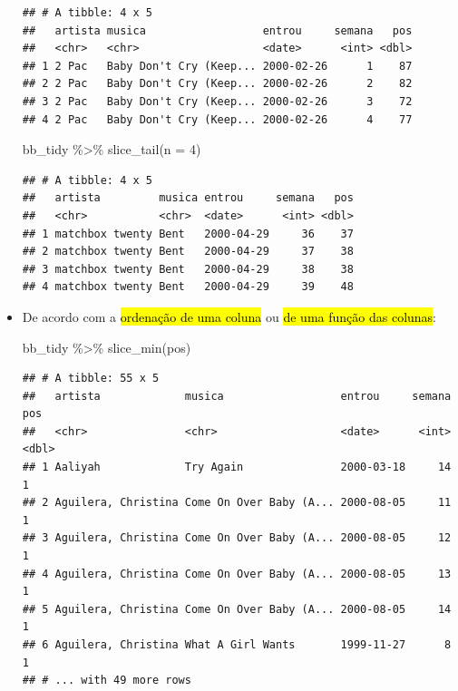 \documentclass[
  11pt]{report}
\newenvironment{Shaded}{\begin{snugshade}}{\end{snugshade}}
\newcommand{\AttributeTok}[1]{\textcolor[rgb]{0.77,0.63,0.00}{#1}}
\newcommand{\DecValTok}[1]{\textcolor[rgb]{0.00,0.00,0.81}{#1}}
\newcommand{\FunctionTok}[1]{\textcolor[rgb]{0.00,0.00,0.00}{#1}}
\newcommand{\NormalTok}[1]{#1}
\newcommand{\SpecialCharTok}[1]{\textcolor[rgb]{0.00,0.00,0.00}{#1}}
\renewenvironment{Shaded}{
    \begin{mdframed}[%
      roundcorner=2pt,%
      innerleftmargin=5pt,%
      innerrightmargin=5pt,%
      topline=true,%
      leftline=true,%
      rightline=true,%
      bottomline=true,%
      linewidth=0.5pt,%
      linecolor=black!20,%
      backgroundcolor=black!2,%
      skipabove=2ex,%
      skipbelow=2.5ex%
    ]%
  }
  {
    \end{mdframed}
  }
\begin{document}
\begin{itemize}
\begin{verbatim}
## # A tibble: 4 x 5
##   artista musica                  entrou     semana   pos
##   <chr>   <chr>                   <date>      <int> <dbl>
## 1 2 Pac   Baby Don't Cry (Keep... 2000-02-26      1    87
## 2 2 Pac   Baby Don't Cry (Keep... 2000-02-26      2    82
## 3 2 Pac   Baby Don't Cry (Keep... 2000-02-26      3    72
## 4 2 Pac   Baby Don't Cry (Keep... 2000-02-26      4    77
\end{verbatim}

\begin{Shaded}
\begin{Highlighting}[]
\NormalTok{bb\_tidy }\SpecialCharTok{\%\textgreater{}\%} 
  \FunctionTok{slice\_tail}\NormalTok{(}\AttributeTok{n =} \DecValTok{4}\NormalTok{)}
\end{Highlighting}
\end{Shaded}

\begin{verbatim}
## # A tibble: 4 x 5
##   artista         musica entrou     semana   pos
##   <chr>           <chr>  <date>      <int> <dbl>
## 1 matchbox twenty Bent   2000-04-29     36    37
## 2 matchbox twenty Bent   2000-04-29     37    38
## 3 matchbox twenty Bent   2000-04-29     38    38
## 4 matchbox twenty Bent   2000-04-29     39    48
\end{verbatim}
\item
  De acordo com a {\hl{ordenação de uma coluna}} ou {\hl{de uma função das colunas}}:

\begin{Shaded}
\begin{Highlighting}[]
\NormalTok{bb\_tidy }\SpecialCharTok{\%\textgreater{}\%} 
  \FunctionTok{slice\_min}\NormalTok{(pos)}
\end{Highlighting}
\end{Shaded}

\begin{verbatim}
## # A tibble: 55 x 5
##   artista             musica                  entrou     semana   pos
##   <chr>               <chr>                   <date>      <int> <dbl>
## 1 Aaliyah             Try Again               2000-03-18     14     1
## 2 Aguilera, Christina Come On Over Baby (A... 2000-08-05     11     1
## 3 Aguilera, Christina Come On Over Baby (A... 2000-08-05     12     1
## 4 Aguilera, Christina Come On Over Baby (A... 2000-08-05     13     1
## 5 Aguilera, Christina Come On Over Baby (A... 2000-08-05     14     1
## 6 Aguilera, Christina What A Girl Wants       1999-11-27      8     1
## # ... with 49 more rows
\end{verbatim}


\end{itemize}
\end{document}
